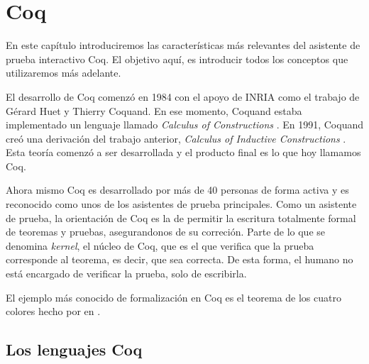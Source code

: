 \chapter{Coq}\label{ch:coq}

En este capítulo introduciremos las características más relevantes del asistente de prueba interactivo Coq. El objetivo aquí, es introducir todos los conceptos que utilizaremos más adelante.

El desarrollo de Coq comenzó en 1984 con el apoyo de INRIA como el trabajo de Gérard Huet y Thierry Coquand. En ese momento, Coquand estaba implementado un lenguaje llamado \emph{Calculus of Constructions} \cite{DBLP:journals/iandc/CoquandH88}.
En 1991, Coquand creó una derivación del trabajo anterior, \emph{Calculus of Inductive Constructions} \cite{CIC}. Esta teoría comenzó a ser desarrollada y el producto final es lo que hoy llamamos Coq.

Ahora mismo Coq es desarrollado por más de 40 personas de forma activa y es reconocido como unos de los asistentes de prueba principales.
Como un asistente de prueba, la orientación de Coq es la de permitir la escritura totalmente formal de teoremas y pruebas, asegurandonos de su correción. Parte de lo que se denomina \textit{kernel}, el núcleo de Coq, que es el que verifica que la prueba corresponde al teorema, es decir, que sea correcta. De esta forma, el humano no está encargado de verificar la prueba, solo de escribirla.

El ejemplo más conocido de formalización en Coq es el teorema de los cuatro colores \cite{DBLP:conf/ascm/Gonthier07} hecho por \citeauthor{DBLP:conf/ascm/Gonthier07} en \citeyear{DBLP:conf/ascm/Gonthier07}.

\section{Los lenguajes Coq}

